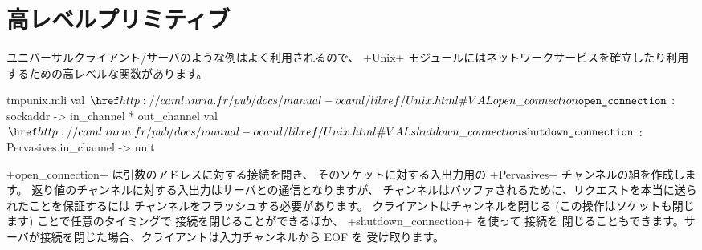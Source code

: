 \section{高レベルプリミティブ}

ユニバーサルクライアント/サーバのような例はよく利用されるので、
\ml+Unix+ モジュールにはネットワークサービスを確立したり利用するための高レベルな関数があります。
%
\begin{listingcodefile}{tmpunix.mli}
val $\indexlibvalue{Unix}{open\_connection}$ : sockaddr -> in_channel * out_channel
val $\indexlibvalue{Unix}{shutdown\_connection}$ : Pervasives.in_channel -> unit
\end{listingcodefile}
%
\ml+open_connection+ は引数のアドレスに対する接続を開き、
そのソケットに対する入出力用の \ml+Pervasives+ チャンネルの組を作成します。
返り値のチャンネルに対する入出力はサーバとの通信となりますが、
チャンネルはバッファされるために、リクエストを本当に送られたことを保証するには
チャンネルをフラッシュする必要があります。
クライアントはチャンネルを閉じる (この操作はソケットも閉じます) ことで任意のタイミングで
接続を閉じることができるほか、 \ml+shutdown_connection+ を使って  接続を
閉じることもできます。サーバが接続を閉じた場合、クライアントは入力チャンネルから EOF を
受け取ります。

